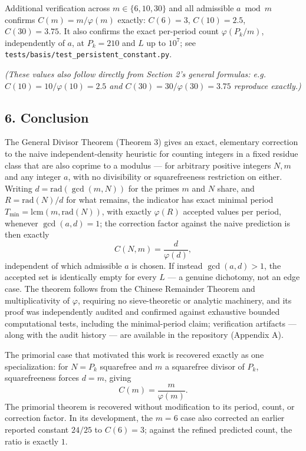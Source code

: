 \documentclass[
]{article}
\begin{document}
Additional verification across \(m\in\{6,10,30\}\) and all admissible
\(a\bmod m\) confirms \(C(m)=m/\varphi(m)\) exactly: \(C(6)=3\),
\(C(10)=2.5\), \(C(30)=3.75\). It also confirms the exact per-period
count \(\varphi(P_k/m)\), independently of \(a\), at \(P_k=210\) and
\(L\) up to \(10^7\); see
\texttt{tests/basis/test\_persistent\_constant.py}.

\emph{(These values also follow directly from Section 2's general
formulas: e.g. \(C(10)=10/\varphi(10)=2.5\) and
\(C(30)=30/\varphi(30)=3.75\) reproduce exactly.)}

\subsection{6. Conclusion}\label{conclusion}

The General Divisor Theorem (Theorem 3) gives an exact, elementary
correction to the naive independent-density heuristic for counting
integers in a fixed residue class that are also coprime to a modulus ---
for arbitrary positive integers \(N,m\) and any integer \(a\), with no
divisibility or squarefreeness restriction on either. Writing
\(d=\mathrm{rad}(\gcd(m,N))\) for the primes \(m\) and \(N\) share, and
\(R=\mathrm{rad}(N)/d\) for what remains, the indicator has exact
minimal period \(T_{\min}=\mathrm{lcm}(m,\mathrm{rad}(N))\), with
exactly \(\varphi(R)\) accepted values per period, whenever
\(\gcd(a,d)=1\); the correction factor against the naive prediction is
then exactly \[
C(N,m) = \frac{d}{\varphi(d)},
\] independent of which admissible \(a\) is chosen. If instead
\(\gcd(a,d)>1\), the accepted set is identically empty for every \(L\)
--- a genuine dichotomy, not an edge case. The theorem follows from the
Chinese Remainder Theorem and multiplicativity of \(\varphi\), requiring
no sieve-theoretic or analytic machinery, and its proof was
independently audited and confirmed against exhaustive bounded
computational tests, including the minimal-period claim; verification
artifacts --- along with the audit history --- are available in the
repository (Appendix A).

The primorial case that motivated this work is recovered exactly as one
specialization: for \(N=P_k\) squarefree and \(m\) a squarefree divisor
of \(P_k\), squarefreeness forces \(d=m\), giving \[
C(m) = \frac{m}{\varphi(m)}.
\] The primorial theorem is recovered without modification to its
period, count, or correction factor. In its development, the \(m=6\)
case also corrected an earlier reported constant \(24/25\) to
\(C(6)=3\); against the refined predicted count, the ratio is exactly
\(1\).
\end{document}
